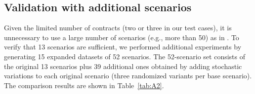 \documentclass[11pt,english]{article}
\begin{document}
\subsection{Validation with additional scenarios}

Given the limited number of contracts (two or three in our test cases), it is unnecessary to use a large number of scenarios (e.g., more than 50) as in \cite{wang2018planning}. To verify that 13 scenarios are sufficient, we performed additional experiments by generating 15 expanded datasets of 52 scenarios. The 52-scenario set consists of the original 13 scenarios plus 39 additional ones obtained by adding stochastic variations to each original scenario (three randomized variants per base scenario). The comparison results are shown in Table~\ref{tab:A2}.

\begin{table}[htbp]
\centering
\caption{Comparison of objective values, cost, and revenue under two scenario sets}
\label{tab:A2}
\end{table}
\end{document}
